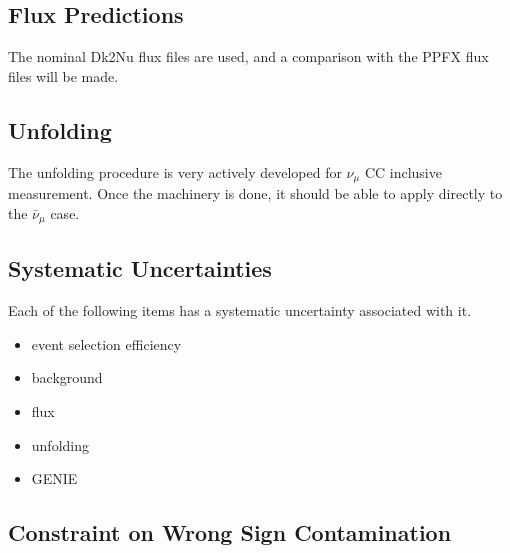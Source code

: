 \documentclass[12pt,a4paper,final]{iopart}
\begin{document}
\subsection{Flux Predictions}
The nominal Dk2Nu flux files are used, and a comparison with the PPFX flux files will be made.

\subsection{Unfolding}
The unfolding procedure is very actively developed for $\nu_\mu$ CC inclusive measurement. Once the machinery is done, it should be able to apply directly to the $\bar{\nu}_\mu$ case.

\subsection{Systematic Uncertainties}
Each of the following items has a systematic uncertainty associated with it.
\begin{itemize}
  \item event selection efficiency
  \item background
  \item flux
  \item unfolding
  \item GENIE
\end{itemize}

\subsection{Constraint on Wrong Sign Contamination}


%
%
\end{document}
